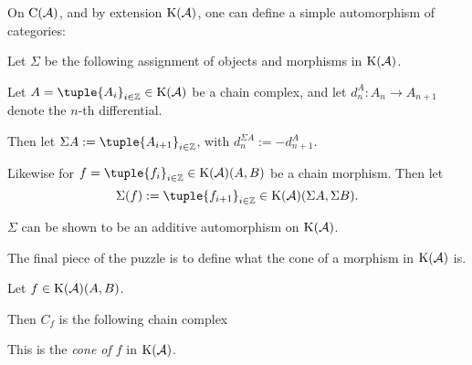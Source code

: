 On \( \operatorname{C}({\mathcal{A}}) \), and by extension \( \K(\Ac) \), one can define a simple automorphism of categories:

\begin{definition}
    \label{def:chain_homotopy_shift}
    Let \( \Sigma \) be the following assignment of objects and morphisms in \( \K(\Ac) \).

    Let \( A = \tuple{A_i}_{i \in \Zb} \in \K(\Ac) \) be a chain complex, and let \( d_n^A: A_n \to A_{n + 1} \) denote the \( n \)-th differential.

    Then let \( \Sigma A := \tuple{A_{i + 1}}_{i \in \Zb} \), with \( d_n^{\Sigma A} := -d_{n + 1}^A \).

    Likewise for \( f = \tuple{f_i}_{i \in \Zb} \in \K(\Ac)(A, B) \) be a chain morphism. Then let
    \[
        \Sigma(f) := \tuple{f_{i + 1}}_{i \in \Zb} \in \K(\Ac)(\Sigma A, \Sigma B).
    \]
\end{definition}

\( \Sigma \) can be shown to be an additive automorphism on \( \K(\Ac) \).

The final piece of the puzzle is to define what the cone of a morphism in \( \K(\Ac) \) is.

\begin{definition}[Cone in \( \K(\Ac) \)]
    Let \( f \in \operatorname{K}({\mathcal{A}})(A, B) \).

    Then \( C_f \) is the following chain complex
    \begin{center}
    \end{center}

    This is the \emph{cone of \( f \)} in \( \K(\Ac) \).
\end{definition}

